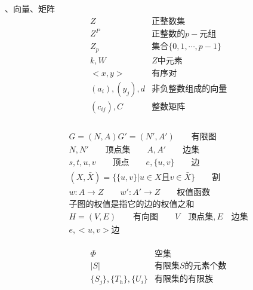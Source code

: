 \documentclass[twocolumn]{article}
\theoremstyle{nonumberplain}%
\begin{document}
\begin{CJK}{UTF8}{gbsn}
\begin{appendices}
      、向量、矩阵
      \begin{equation}\nonumber
      \begin{aligned}
        &Z& \text{正整数集}\\
        &Z^P& \text{正整数的}p-\text{元组}\\
        &Z_p& \text{集合}\{0,1,\cdots,p-1\}\\
        &k,W& Z\text{中元素}\\
        &<x,y>& \text{有序对}\\
        &(a_i),(y_j),d& \text{非负整数组成的向量}\\
        &(c_{ij}),C& \text{整数矩阵}\\
      \end{aligned}
      \end{equation}
      \\
      
      \begin{equation}\nonumber
      \begin{aligned}
      &G=(N,A) G'=(N',A') \qquad \text{有限图}\\
      &N,N' \qquad \text{顶点集} \qquad A,A' \qquad \text{边集}\\
      &s,t,u,v \qquad \text{顶点} \qquad e,\{u,v\} \qquad \text{边}\\
      &(X,\bar{X})=\{\{u,v\}| u\in X\text{且}v\in \bar{X}\} \qquad \text{割}\\
      &w:A\rightarrow Z \qquad w':A'\rightarrow Z \qquad \text{权值函数}\\
      &\text{子图的权值是指它的边的权值之和}\\
      &H=(V,E) \qquad \text{有向图} \qquad V \quad \text{顶点集}, E \quad \text{边集}\\
      &e,<u,v> \text{边}
      \end{aligned}
      \end{equation}
      \\
      
      \begin{equation}\nonumber
      \begin{aligned}
      &\Phi& \text{空集} \\
      &|S| & \text{有限集}S\text{的元素个数} \\
      &\{S_j\},\{T_h\},\{U_i\}&\text{有限集的有限族}
      \end{aligned}
      \end{equation}
    \end{appendices}








\end{CJK}
\end{document}
